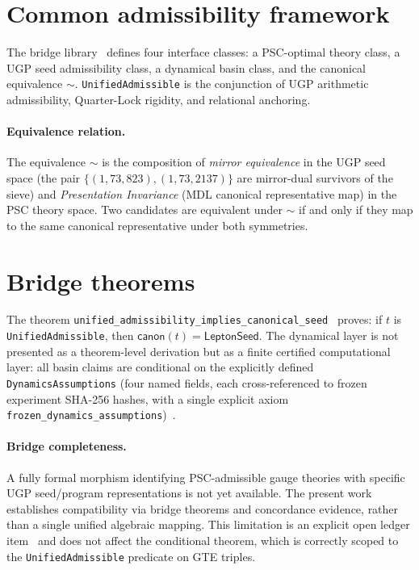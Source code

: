 \documentclass[11pt,twocolumn]{article}
\theoremstyle{remark}
\begin{document}
\section{Common admissibility framework}
The bridge library~\cite{unified-rigidity-lean} defines four interface classes:
a PSC-optimal theory class, a UGP seed admissibility class, a dynamical basin class, and
the canonical equivalence $\sim$.
\texttt{UnifiedAdmissible} is the conjunction of UGP arithmetic admissibility, Quarter-Lock
rigidity, and relational anchoring.

\paragraph{Equivalence relation.}
The equivalence $\sim$ is the composition of \emph{mirror equivalence} in the UGP seed space
(the pair $\{(1,73,823),(1,73,2137)\}$ are mirror-dual survivors of the sieve) and
\emph{Presentation Invariance} (MDL canonical representative map) in the PSC theory space.
Two candidates are equivalent under $\sim$ if and only if they map to the same canonical
representative under both symmetries.

\section{Bridge theorems}
The theorem \texttt{unified\_\allowbreak{}admissibility\_\allowbreak{}implies\_\allowbreak{}canonical\_seed}~\cite{unified-rigidity-lean,ugp-lean}
proves: if $t$ is \texttt{UnifiedAdmissible}, then $\mathsf{canon}(t)=\mathsf{LeptonSeed}$.
The dynamical layer is not presented as a theorem-level derivation but as a finite certified
computational layer: all basin claims are conditional on the explicitly defined
\texttt{DynamicsAssumptions} (four named fields, each cross-referenced to frozen experiment
SHA-256 hashes, with a single explicit axiom
\texttt{frozen\_\allowbreak{}dynamics\_\allowbreak{}assumptions})~\cite{unified-rigidity-lean,ugp-physics-repo}.

\paragraph{Bridge completeness.}
A fully formal morphism identifying PSC-admissible gauge theories with specific UGP
seed/program representations is not yet available.
The present work establishes compatibility via bridge theorems and concordance evidence,
rather than a single unified algebraic mapping.
This limitation is an explicit open ledger item~\cite{unified-rigidity-lean} and does not
affect the conditional theorem, which is correctly scoped to the \texttt{UnifiedAdmissible}
predicate on GTE triples.
\end{document}
